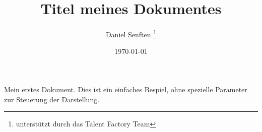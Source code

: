 \documentclass{manual}
\title{Titel meines Dokumentes}
\author{Daniel Senften \thanks{unterstützt durch das Talent Factory Team}}
\date{\today}
\begin{document}
    Mein erstes Dokument. Dies ist ein einfaches Bespiel,
    ohne spezielle Parameter zur Steuerung der Darstellung.
\end{document}
